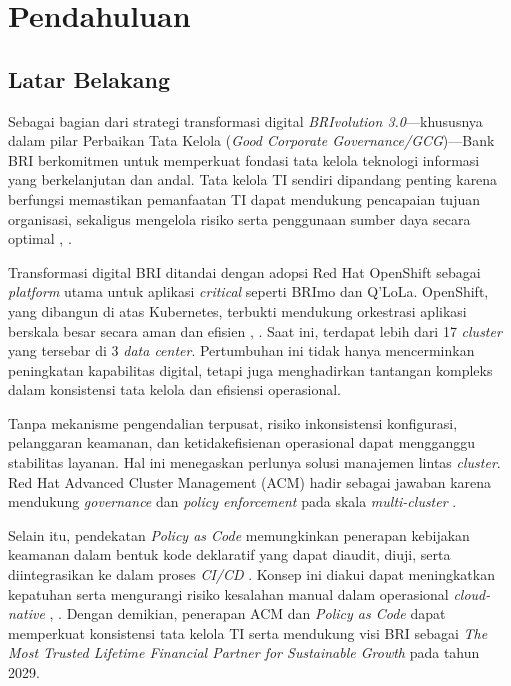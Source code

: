 \chapter{Pendahuluan}

\section{Latar Belakang}

Sebagai bagian dari strategi transformasi digital \emph{BRIvolution 3.0}—khususnya dalam pilar Perbaikan Tata Kelola (\emph{Good Corporate Governance/GCG})—Bank BRI berkomitmen untuk memperkuat fondasi tata kelola teknologi informasi yang berkelanjutan dan andal. Tata kelola TI sendiri dipandang penting karena berfungsi memastikan pemanfaatan TI dapat mendukung pencapaian tujuan organisasi, sekaligus mengelola risiko serta penggunaan sumber daya secara optimal \cite{isaca2012cobit5}, \cite{catersteel2005itgov}.

Transformasi digital BRI ditandai dengan adopsi Red Hat OpenShift sebagai \emph{platform} utama untuk aplikasi \emph{critical} seperti BRImo dan Q’LoLa. OpenShift, yang dibangun di atas Kubernetes, terbukti mendukung orkestrasi aplikasi berskala besar secara aman dan efisien \cite{redhat2022openshift}, \cite{burns2021kubernetes}. Saat ini, terdapat lebih dari 17 \emph{cluster} yang tersebar di 3 \emph{data center}. Pertumbuhan ini tidak hanya mencerminkan peningkatan kapabilitas digital, tetapi juga menghadirkan tantangan kompleks dalam konsistensi tata kelola dan efisiensi operasional.

Tanpa mekanisme pengendalian terpusat, risiko inkonsistensi konfigurasi, pelanggaran keamanan, dan ketidakefisienan operasional dapat mengganggu stabilitas layanan. Hal ini menegaskan perlunya solusi manajemen lintas \emph{cluster}. Red Hat Advanced Cluster Management (ACM) hadir sebagai jawaban karena mendukung \emph{governance} dan \emph{policy enforcement} pada skala \emph{multi-cluster} \cite{redhat2023acm}.

Selain itu, pendekatan \emph{Policy as Code} memungkinkan penerapan kebijakan keamanan dalam bentuk kode deklaratif yang dapat diaudit, diuji, serta diintegrasikan ke dalam proses \emph{CI/CD} \cite{torstensson2021policyascode}. Konsep ini diakui dapat meningkatkan kepatuhan serta mengurangi risiko kesalahan manual dalam operasional \emph{cloud-native} \cite{opa2022docs}, \cite{kyverno2023docs}. Dengan demikian, penerapan ACM dan \emph{Policy as Code} dapat memperkuat konsistensi tata kelola TI serta mendukung visi BRI sebagai \emph{The Most Trusted Lifetime Financial Partner for Sustainable Growth} pada tahun 2029.

